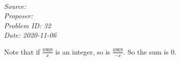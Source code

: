 \SSbreak\\
\emph{Source: \Cop}\\
\emph{Proposer:  \Pchan}\\
\emph{Problem ID: 32}\\
\emph{Date: 2020-11-06}\\
\SSbreak

\bigskip 

\begin{solution}\hfil\medskip

    Note that if $\frac{6969}x$ is an integer, so is $\frac{6969}{-x}$. So the sum is $\boxed{0}$.
\end{solution}\bigskip